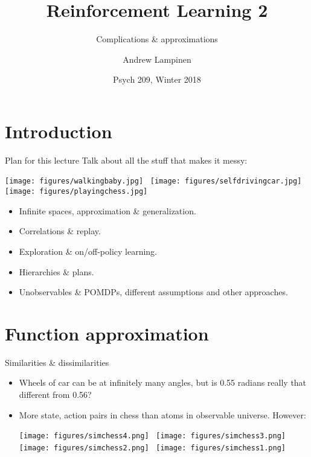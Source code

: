 \documentclass{beamer} %
\begin{document}
\title{Reinforcement Learning 2}
\subtitle{Complications \& approximations}
\author{Andrew Lampinen}
\date{Psych 209, Winter 2018}
\frame{\titlepage}


\section{Introduction}
\begin{frame}{Plan for this lecture}
Talk about all the stuff that makes it messy: 
\begin{center}
    \texttt{[image: figures/walkingbaby.jpg]}~
    \texttt{[image: figures/selfdrivingcar.jpg]}~
    \texttt{[image: figures/playingchess.jpg]}
\end{center}
\vspace{-1em}
\begin{itemize}
    \item<2-> Infinite spaces, approximation \& generalization.
    \item<3-> Correlations \& replay.
    \item<4-> Exploration \& on/off-policy learning.
    \item<5-> Hierarchies \& plans.
    \item<6-> Unobservables \& POMDPs, different assumptions and other approaches.
\end{itemize}
\end{frame}

\section{Function approximation}

\begin{frame}{Similarities \& dissimilarities}
\begin{itemize}
    \item Wheels of car can be at infinitely many angles, but is 0.55 radians really that different from 0.56?
    \item<2-> More state, action pairs in chess than atoms in observable universe. However: \vspace{0.5em} 
    \begin{center}
        \texttt{[image: figures/simchess4.png]}~
        \texttt{[image: figures/simchess3.png]} \\[5pt]
        \texttt{[image: figures/simchess2.png]}~
        \texttt{[image: figures/simchess1.png]}
    \end{center}
\end{itemize}
\end{frame}
\end{document}
